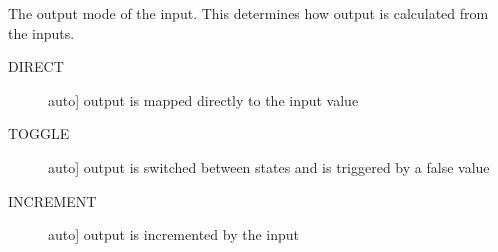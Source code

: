 \documentclass[letterpaper,10pt,english]{sphinxmanual}
\begin{document}
\begin{fulllineitems}
\label{\detokenize{base:OutputObject.ControlType}}
\sphinxAtStartPar
The output mode of the input. This determines how output is calculated from the inputs.
\begin{description}
\item[{DIRECT}] \leavevmode{[}auto{]}
\sphinxAtStartPar
output is mapped directly to the input value

\item[{TOGGLE}] \leavevmode{[}auto{]}
\sphinxAtStartPar
output is switched between states and is triggered by a false value

\item[{INCREMENT}] \leavevmode{[}auto{]}
\sphinxAtStartPar
output is incremented by the input

\end{description}

\end{fulllineitems}

\end{document}
